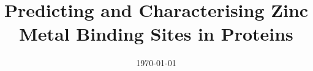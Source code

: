 \documentclass[a4paper, 12pt, oneside]{Style/UCLThesis}  %
\begin{document}
\frontmatter	  %

\title  {Predicting and Characterising Zinc Metal Binding Sites in Proteins}
\addresses  {\groupname\\\deptname\\\univname}  %
\date       {\today}
\subject    {}
\keywords   {}

\maketitle


\fancyhead{}  %
\rhead{\thepage}  %
\lhead{}  %

\pagestyle{fancy}  %
\end{document}
